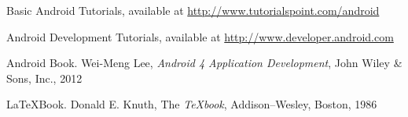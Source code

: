 
\renewcommand{\bibname}{References}

\begin{thebibliography}{9}

Basic Android Tutorials, available at \url{http://www.tutorialspoint.com/android}

Android Development Tutorials, available at \url{http://www.developer.android.com}

Android Book. Wei-Meng Lee, \emph{Android 4 Application Development}, John Wiley \& Sons, Inc., 2012

\LaTeX Book. Donald E. Knuth, The \emph{TeXbook}, Addison–Wesley, Boston, 1986

\end{thebibliography}
